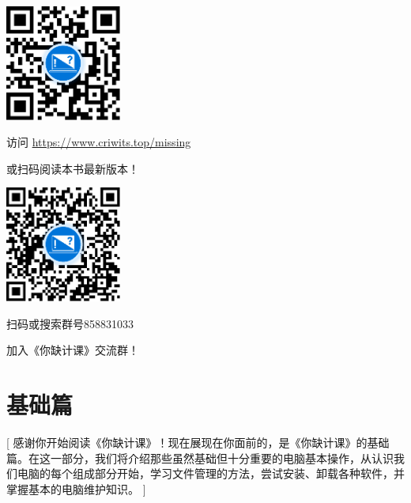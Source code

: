 \documentclass[a4paper]{book}
\begin{document}
\begin{center}
  \vspace*{.5cm}
  \begin{minipage}{.45\textwidth}
    \centering
    \vskip0.6cm
    \includegraphics[width=3.8cm]{assets/QR_code.pdf}\par
    \vskip0.6cm
    访问 \url{https://www.criwits.top/missing}\par
    或扫码阅读本书最新版本！\par
  \end{minipage}
  \qquad
  \begin{minipage}{.45\textwidth}
    \centering
    \vskip0.6cm
    \includegraphics[width=3.8cm]{assets/QQ_group.pdf}\par
    \vskip0.6cm
    扫码或搜索群号858831033\par
    加入《你缺计课》交流群！\par
  \end{minipage}
\end{center}  



\tableofcontents

\mainmatter

\part{基础篇}[
  感谢你开始阅读《你缺计课》！现在展现在你面前的，是《你缺计课》的基础篇。在这一部分，我们将介绍那些虽然基础但十分重要的电脑基本操作，从认识我们电脑的每个组成部分开始，学习文件管理的方法，尝试安装、卸载各种软件，并掌握基本的电脑维护知识。
]








\end{document}
